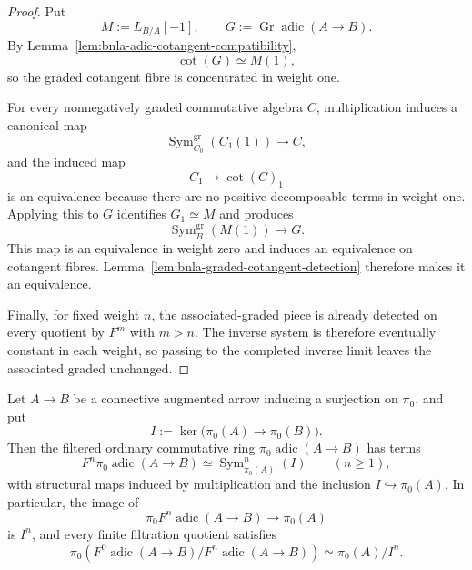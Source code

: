 \begin{proof}
Put
\[
    M:=L_{B/A}[-1],
    \qquad
    G:=\operatorname{Gr}\operatorname{adic}(A\to B).
\]
By Lemma~\ref{lem:bnla-adic-cotangent-compatibility},
\[
    \operatorname{cot}(G)
    \simeq
    M(1),
\]
so the graded cotangent fibre is concentrated in weight one.

For every nonnegatively graded commutative algebra $C$, multiplication
induces a canonical map
\[
    \operatorname{Sym}^{\mathrm{gr}}_{C_0}
    \left(C_1(1)\right)
    \longrightarrow C,
\]
and the induced map
\[
    C_1\longrightarrow\operatorname{cot}(C)_1
\]
is an equivalence because there are no positive decomposable terms in weight
one.  Applying this to $G$ identifies $G_1\simeq M$ and produces
\[
    \operatorname{Sym}^{\mathrm{gr}}_B(M(1))
    \longrightarrow G.
\]
This map is an equivalence in weight zero and induces an equivalence on
cotangent fibres.  Lemma~\ref{lem:bnla-graded-cotangent-detection} therefore
makes it an equivalence.

Finally, for fixed weight $n$, the associated-graded piece is already
detected on every quotient by $F^m$ with $m>n$.  The inverse system is
therefore eventually constant in each weight, so passing to the completed
inverse limit leaves the associated graded unchanged.
\end{proof}

\begin{proposition}
\label{prop:bnla-adic-pi-zero}
Let $A\to B$ be a connective augmented arrow inducing a surjection on
$\pi_0$, and put
\[
    I:=\ker\bigl(\pi_0(A)\to\pi_0(B)\bigr).
\]
Then the filtered ordinary commutative ring
$\pi_0\operatorname{adic}(A\to B)$ has terms
\[
    F^n\pi_0\operatorname{adic}(A\to B)
    \simeq
    \operatorname{Sym}^n_{\pi_0(A)}(I)
    \qquad(n\geq1),
\]
with structural maps induced by multiplication and the inclusion
$I\hookrightarrow\pi_0(A)$.  In particular, the image of
\[
    \pi_0F^n\operatorname{adic}(A\to B)
    \longrightarrow
    \pi_0(A)
\]
is $I^n$, and every finite filtration quotient satisfies
\[
\boxed{
    \pi_0\left(
        F^0\operatorname{adic}(A\to B)/
        F^n\operatorname{adic}(A\to B)
    \right)
    \simeq
    \pi_0(A)/I^n.}
\]
\end{proposition}

